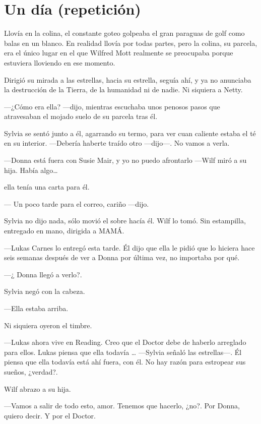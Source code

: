 \chapter*{Un día (repetición)}

Llovía en la colina, el constante goteo golpeaba el gran paraguas de
golf como balas en un blanco. En realidad llovía por todas partes, pero
la colina, su parcela, era el único lugar en el que Wilfred Mott
realmente se preocupaba porque estuviera lloviendo en ese momento.

Dirigió su mirada a las estrellas, hacia su estrella, seguía ahí, y ya
no anunciaba la destrucción de la Tierra, de la humanidad ni de nadie.
Ni siquiera a Netty.

---¿Cómo era ella? ---dijo, mientras escuchaba unos penosos pasos que
atravesaban el mojado suelo de su parcela tras él.

Sylvia se sentó junto a él, agarrando su termo, para ver cuan caliente
estaba el té en su interior. ---Debería haberte traído otro ---dijo---.
No vamos a verla.

---Donna está fuera con Susie Mair, y yo no puedo afrontarlo ---Wilf
miró a su hija. Había algo\ldots{}

ella tenía una carta para él.

--- Un poco tarde para el correo, cariño ---dijo.

Sylvia no dijo nada, sólo movió el sobre hacía él. Wilf lo tomó. Sin
estampilla, entregado en mano, dirigida a MAMÁ.

---Lukas Carnes lo entregó esta tarde. Él dijo que ella le pidió que lo
hiciera hace seis semanas después de ver a Donna por última vez, no
importaba por qué.

---¿ Donna llegó a verlo?.

Sylvia negó con la cabeza.

---Ella estaba arriba.

Ni siquiera oyeron el timbre.

---Lukas ahora vive en Reading. Creo que el Doctor debe de haberlo
arreglado para ellos. Lukas piensa que ella todavía \ldots{} ---Sylvia
señaló las estrellas---. Él piensa que ella todavía está ahí fuera, con
él. No hay razón para estropear sus sueños, ¿verdad?.

Wilf abrazo a su hija.

---Vamos a salir de todo esto, amor. Tenemos que hacerlo, ¿no?. Por
Donna, quiero decir. Y por el Doctor.

